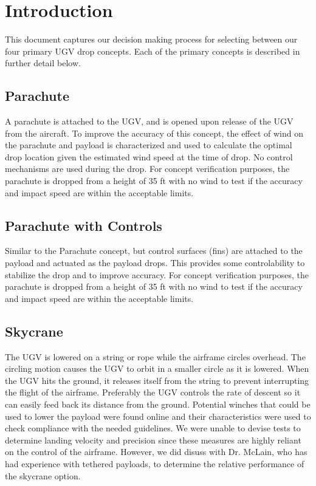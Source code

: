 \documentclass[]{auvsi_doc}
\begin{document}
\begin{AUVSITitlePage}
\begin{artifacttable}
\end{artifacttable}
\end{AUVSITitlePage}


\section{Introduction}
This document captures our decision making process for selecting between our four primary UGV drop concepts.
Each of the primary concepts is described in further detail below. 

\subsection{Parachute}
A parachute is attached to the UGV, and is opened upon release of the UGV from the aircraft. To improve the accuracy of this concept, the effect of wind on the parachute and payload is characterized and used to calculate the optimal drop location given the estimated wind speed at the time of drop. No control mechanisms are used during the drop. For concept verification purposes, the parachute is dropped from a height of 35 ft with no wind to test  if the accuracy and impact speed are within the acceptable limits.

\subsection{Parachute with Controls}
Similar to the Parachute concept, but control surfaces (fins) are attached to the payload and actuated as the payload drops. This provides some controlability to stabilize the drop and to improve accuracy. For concept verification purposes, the parachute is dropped from a height of 35 ft with no wind to test  if the accuracy and impact speed are within the acceptable limits.

\subsection{Skycrane}
The UGV is lowered on a string or rope while the airframe circles overhead. The circling motion causes the UGV to orbit in a smaller circle as it is lowered. When the UGV hits the ground, it releases itself from the string to prevent interrupting the flight of the airframe. Preferably the UGV controls the rate of descent so it can easily feed back its distance from the ground. Potential winches that could be used to lower the payload were found online and their characteristics were used to check compliance with the needed guidelines. We were unable to devise tests to determine landing velocity and precision since these measures are highly reliant on the control of the airframe. However, we did disuss with Dr. McLain, who has had experience with tethered payloads, to determine the relative performance of the skycrane option.
\end{document}
